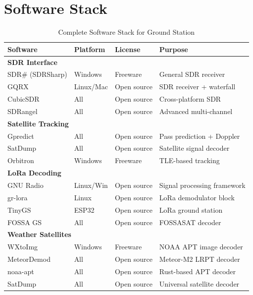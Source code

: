 \documentclass[12pt,a4paper]{article}
\begin{document}
\section{Software Stack}

\begin{table}[h!]
\centering
\caption{Complete Software Stack for Ground Station}
\begin{tabular}{@{}lllp{3.5cm}@{}}
\toprule
\textbf{Software} & \textbf{Platform} & \textbf{License} & \textbf{Purpose} \\
\midrule
\multicolumn{4}{l}{\textbf{SDR Interface}} \\
\midrule
SDR\# (SDRSharp) & Windows & Freeware & General SDR receiver \\
GQRX & Linux/Mac & Open source & SDR receiver + waterfall \\
CubicSDR & All & Open source & Cross-platform SDR \\
SDRangel & All & Open source & Advanced multi-channel \\

\midrule
\multicolumn{4}{l}{\textbf{Satellite Tracking}} \\
\midrule
Gpredict & All & Open source & Pass prediction + Doppler \\
SatDump & All & Open source & Satellite signal decoder \\
Orbitron & Windows & Freeware & TLE-based tracking \\

\midrule
\multicolumn{4}{l}{\textbf{LoRa Decoding}} \\
\midrule
GNU Radio & Linux/Win & Open source & Signal processing framework \\
gr-lora & Linux & Open source & LoRa demodulator block \\
TinyGS & ESP32 & Open source & LoRa ground station \\
FOSSA GS & All & Open source & FOSSASAT decoder \\

\midrule
\multicolumn{4}{l}{\textbf{Weather Satellites}} \\
\midrule
WXtoImg & Windows & Freeware & NOAA APT image decoder \\
MeteorDemod & All & Open source & Meteor-M2 LRPT decoder \\
noaa-apt & All & Open source & Rust-based APT decoder \\
SatDump & All & Open source & Universal satellite decoder \\


\end{tabular}
\end{table}
\end{document}
